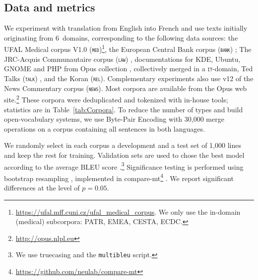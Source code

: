 \documentclass[11pt,a4paper]{article}
\newcommand{\fyDone}[1]{\done[FY]\Todo[FY:]{\textcolor{orange}{#1}}}
\newcommand{\revision}[1]{#1}
\newcommand{\domain}[1]{\texttt{\textsc{#1}}}
\begin{document}
\subsection{Data and metrics \label{ssec:corpora}}
We experiment with translation from English into French and use texts initially originating from 6~domains, corresponding to the following data sources: the UFAL Medical corpus V1.0 (\domain{med})\footnote{\url{https://ufal.mff.cuni.cz/ufal_medical_corpus}. \revision{We only use the in-domain (medical) subcorpora: PATR, EMEA, CESTA, ECDC.}}, the European Central Bank corpus (\domain{bank}) \cite{Tiedemann12parallel}; The JRC-Acquis Communautaire corpus (\domain{law}) \cite{Steinberger06acquis}, documentations for KDE, Ubuntu, GNOME and PHP from Opus collection \cite{Tiedemann09news}, collectively merged in a \domain{it}-domain, Ted Talks (\domain{talk}) \cite{Cettolo12wit}, and the Koran (\domain{rel}). Complementary experiments also use v12 of the News Commentary corpus (\domain{news}). Most corpora are available from the Opus web site.\footnote{\url{http://opus.nlpl.eu}} These corpora were deduplicated and tokenized with in-house tools; statistics are in Table~\ref{tab:Corpora}. To reduce the number of types and build open-vocabulary systems, we use Byte-Pair Encoding \cite{Sennrich16BPE} with 30,000 merge operations on a corpus containing all sentences in both languages.\fyDone{Add \# number of tokens, also specificity ?}%

We randomly select in each corpus a development and a test set of 1,000 lines and keep the rest for training. Validation sets are used to chose the best model according to the average BLEU score \cite{Papineni02bleu}.\footnote{We use truecasing and the \texttt{multibleu} script.}\fyDone{A word about meta-parameter settings} Significance testing is performed using bootstrap resampling \cite{Koehn04statistical}, implemented in compare-mt\footnote{\url{https://github.com/neulab/compare-mt}} \cite{Neubig19compare-mt}. We report significant differences at the level of $p=0.05$.\fyDone{Fix correct p value}

\end{document}
